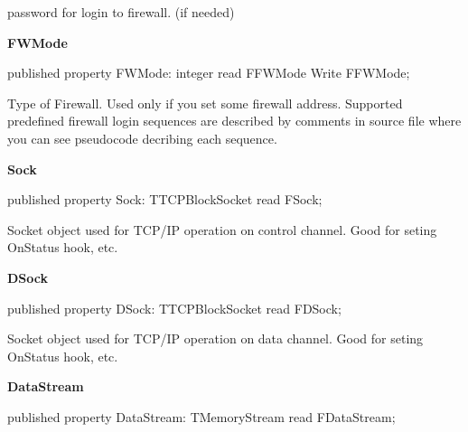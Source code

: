 \documentclass{report}
\newif\ifpdf
\begin{document}
\begin{list}{}
\par password for login to firewall. (if needed)\label{ftpsend.TFTPSend-FWMode}
\item[\textbf{FWMode}\hfill]
\ifpdf
\begin{flushleft}
\fi
\begin{ttfamily}
published property FWMode: integer read FFWMode Write FFWMode;\end{ttfamily}

\ifpdf
\end{flushleft}
\fi


\par Type of Firewall. Used only if you set some firewall address. Supported predefined firewall login sequences are described by comments in source file where you can see pseudocode decribing each sequence.\label{ftpsend.TFTPSend-Sock}
\item[\textbf{Sock}\hfill]
\ifpdf
\begin{flushleft}
\fi
\begin{ttfamily}
published property Sock: TTCPBlockSocket read FSock;\end{ttfamily}

\ifpdf
\end{flushleft}
\fi


\par Socket object used for TCP/IP operation on control channel. Good for seting OnStatus hook, etc.\label{ftpsend.TFTPSend-DSock}
\item[\textbf{DSock}\hfill]
\ifpdf
\begin{flushleft}
\fi
\begin{ttfamily}
published property DSock: TTCPBlockSocket read FDSock;\end{ttfamily}

\ifpdf
\end{flushleft}
\fi


\par Socket object used for TCP/IP operation on data channel. Good for seting OnStatus hook, etc.\label{ftpsend.TFTPSend-DataStream}
\item[\textbf{DataStream}\hfill]
\ifpdf
\begin{flushleft}
\fi
\begin{ttfamily}
published property DataStream: TMemoryStream read FDataStream;\end{ttfamily}

\ifpdf
\end{flushleft}
\fi



\end{list}
\end{document}
